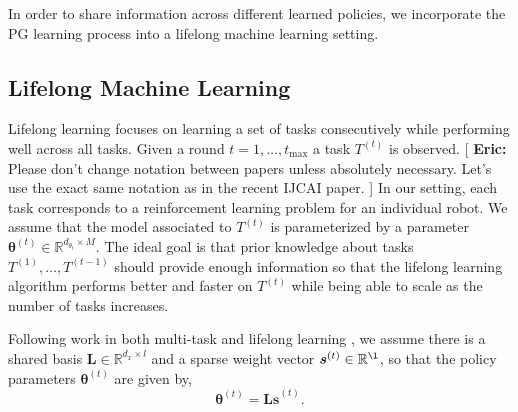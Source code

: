 \documentclass{aamas2016}
\renewcommand{\Re}{\mathbb{R}}
\newcommand{\note}[3]{{\color{#2} [ \ding{42} \textbf{#1:} {\small #3} ]}}
\newcommand{\comEric}[1]{\note{Eric}{blue}{#1}}
\begin{document}
In order to share information across different learned policies, we incorporate the PG learning process into a lifelong machine learning 
setting.





\subsection{Lifelong Machine Learning}


Lifelong learning focuses on learning a set of tasks consecutively while performing well across all tasks. Given a round $t = 1,\dots,t_{\max}$ a task $T^{(t)}$ is observed. \comEric{Please don't change notation between papers unless absolutely necessary.  Let's use the exact same notation as in the recent IJCAI paper.} In our setting, each task corresponds to a reinforcement learning problem for an individual robot. We assume that the model associated to $T^{(t)}$ is parameterized by a parameter $\boldsymbol{\theta}^{(t)} \in \Re^{d_{\theta_{t}}\times M}$. The ideal goal is that prior knowledge about tasks $T^{(1)},\ldots,T^{(t-1)}$ should provide enough information so that the lifelong learning algorithm performs better and faster on $T^{(t)}$ while being able to scale as the number of tasks increases.

Following work in both multi-task \cite{Kumar-2012} and lifelong learning \cite{Ruvolo2013}, we assume there is a shared basis $\boldsymbol{L}\in \Re^{d_{x}\times l}$ and a sparse weight vector $\boldsymbol{s}^{(t)}\in \Re^{\l}$, so that the policy parameters $\boldsymbol{\theta}^{(t)}$
are given by,
\begin{displaymath}
 \boldsymbol{\theta}^{(t)}=\boldsymbol{Ls}^{(t)}.
\end{displaymath}
\end{document}
